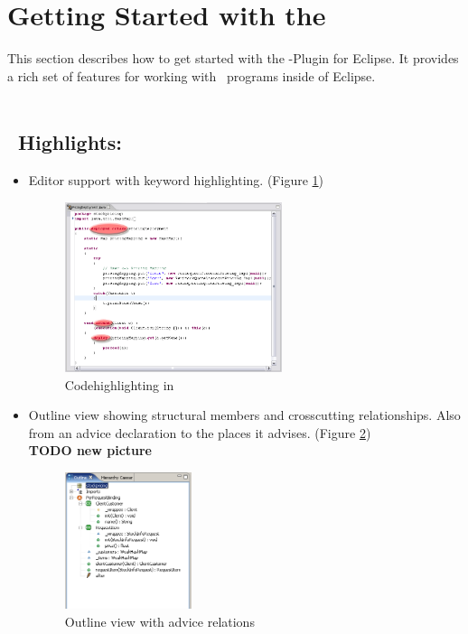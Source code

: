 \section{Getting Started with the \cjdt}
This section describes how to get started with the \cjdt -Plugin for Eclipse. It provides a rich set of features for working with \caesarj ~programs inside of Eclipse.\\\\
\subsection{\cjdt ~Highlights:}
\begin{itemize}
	\item Editor support with keyword highlighting. (Figure \ref{fig:hilight})
	
\begin{figure}[htbp]
	\centering
		\includegraphics[width=0.60\textwidth]{images/hilight.png}
	\caption{Codehighlighting in \cjdt}
	\label{fig:hilight}
\end{figure}

  \item Outline view showing structural members and crosscutting relationships. Also from an advice declaration to the places it advises. (Figure \ref{fig:outline})\\ \textbf{TODO new picture}

\begin{figure}[htbp]
	\centering
		\includegraphics[width=0.35\textwidth]{images/outline.png}
	\caption{Outline view with advice relations}
	\label{fig:outline}
\end{figure}


\end{itemize}

